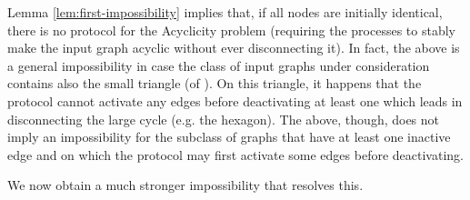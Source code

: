 \documentclass[preprint]{elsarticle}
\begin{document}
Lemma \ref{lem:first-impossibility} implies that, if all nodes are initially identical, there is no protocol for the Acyclicity problem (requiring the processes to stably make the input graph acyclic without ever disconnecting it). In fact, the above is a general impossibility in case the class of input graphs under consideration contains also the small triangle (of ). On this triangle, it happens that the protocol cannot activate any edges before deactivating at least one which leads in disconnecting the large cycle (e.g. the hexagon). The above, though, does not imply an impossibility for the subclass of graphs that have at least one inactive edge and on which the protocol may first activate some edges before deactivating.

We now obtain a much stronger impossibility that resolves this.
\end{document}
